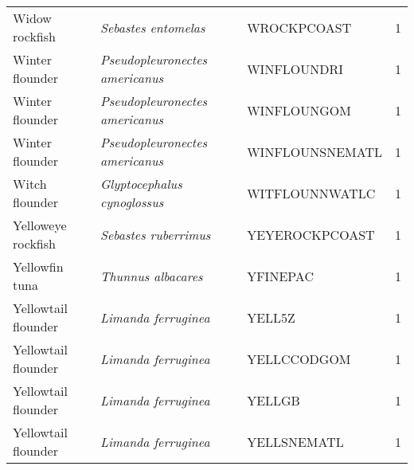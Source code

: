 \begin{center}
\begin{footnotesize}
\begin{longtable}{l | l | l | r}
Widow rockfish & \textit{Sebastes entomelas} & WROCKPCOAST & 1 \\
Winter flounder & \textit{Pseudopleuronectes americanus} & WINFLOUNDRI & 1 \\
Winter flounder & \textit{Pseudopleuronectes americanus} & WINFLOUNGOM & 1 \\
Winter flounder & \textit{Pseudopleuronectes americanus} & WINFLOUNSNEMATL & 1 \\
Witch flounder & \textit{Glyptocephalus cynoglossus} & WITFLOUNNWATLC & 1 \\
Yelloweye rockfish & \textit{Sebastes ruberrimus} & YEYEROCKPCOAST & 1 \\
Yellowfin tuna & \textit{Thunnus albacares} & YFINEPAC & 1 \\
Yellowtail flounder & \textit{Limanda ferruginea} & YELL5Z & 1 \\
Yellowtail flounder & \textit{Limanda ferruginea} & YELLCCODGOM & 1 \\
Yellowtail flounder & \textit{Limanda ferruginea} & YELLGB & 1 \\
Yellowtail flounder & \textit{Limanda ferruginea} & YELLSNEMATL & 1 \\

\end{longtable}\end{footnotesize}
\end{center}
